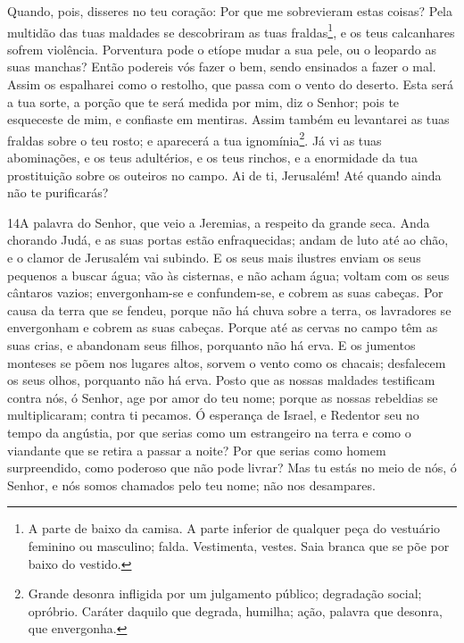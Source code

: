 Quando, pois, disseres no teu coração: Por que me sobrevieram
estas coisas? Pela multidão das tuas maldades se descobriram as tuas
fraldas\footnote{A parte de baixo da camisa. A parte inferior de
qualquer peça do vestuário feminino ou masculino; falda. Vestimenta,
vestes. Saia branca que se põe por baixo do vestido.}, e os teus
calcanhares sofrem violência. Porventura pode o etíope mudar
a sua pele, ou o leopardo as suas manchas? Então podereis vós fazer
o bem, sendo ensinados a fazer o mal. Assim os espalharei
como o restolho, que passa com o vento do deserto. Esta será
a tua sorte, a porção que te será medida por mim, diz o Senhor; pois
te esqueceste de mim, e confiaste em mentiras. Assim também
eu levantarei as tuas fraldas sobre o teu rosto; e aparecerá a tua
ignomínia\footnote{Grande desonra infligida por um julgamento
público; degradação social; opróbrio. Caráter daquilo que degrada,
humilha; ação, palavra que desonra, que envergonha.}. Já vi
as tuas abominações, e os teus adultérios, e os teus rinchos, e a
enormidade da tua prostituição sobre os outeiros no campo. Ai de ti,
Jerusalém! Até quando ainda não te purificarás?

\medskip

\lettrine{14} A palavra do Senhor, que veio a Jeremias, a
respeito da grande seca. Anda chorando Judá, e as suas portas
estão enfraquecidas; andam de luto até ao chão, e o clamor de
Jerusalém vai subindo. E os seus mais ilustres enviam os seus
pequenos a buscar água; vão às cisternas, e não acham água; voltam
com os seus cântaros vazios; envergonham-se e confundem-se, e cobrem
as suas cabeças. Por causa da terra que se fendeu, porque não há
chuva sobre a terra, os lavradores se envergonham e cobrem as suas
cabeças. Porque até as cervas no campo têm as suas crias, e
abandonam seus filhos, porquanto não há erva. E os jumentos
monteses se põem nos lugares altos, sorvem o vento como os chacais;
desfalecem os seus olhos, porquanto não há erva. Posto que as
nossas maldades testificam contra nós, ó Senhor, age por amor do teu
nome; porque as nossas rebeldias se multiplicaram; contra ti
pecamos. Ó esperança de Israel, e Redentor seu no tempo da
angústia, por que serias como um estrangeiro na terra e como o
viandante que se retira a passar a noite? Por que serias como
homem surpreendido, como poderoso que não pode livrar? Mas tu estás
no meio de nós, ó Senhor, e nós somos chamados pelo teu nome; não
nos desampares.

